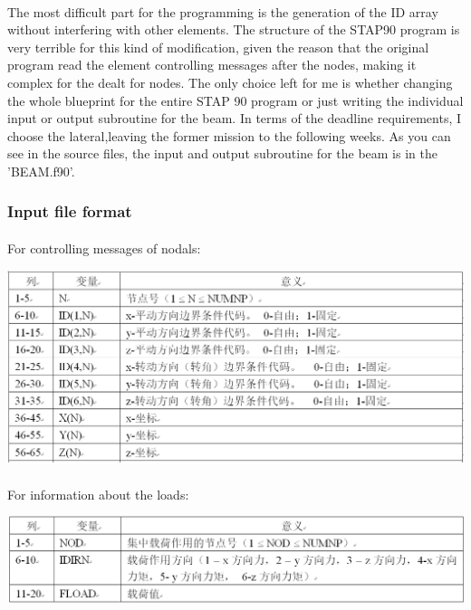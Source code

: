 \documentclass[UTF8]{ctexbook}
\begin{document}
\paragraph{}
The most difficult part for the programming is the generation of the ID array without interfering with other elements. The structure of the STAP90 program is very terrible for this kind of modification, given the reason that the original program read the element controlling messages after the nodes, making it complex for the dealt for nodes. The only choice left for me is whether changing the whole blueprint for the entire STAP 90 program or just writing the individual input or output subroutine for  the beam. In terms of the deadline requirements, I choose the lateral,leaving the former mission to the following weeks. As you can see in the source files, the input and output subroutine for the beam is in the 'BEAM.f90'.
\subsubsection{Input file format}
\paragraph{}For controlling messages of nodals:
\begin{center}
\includegraphics[width=1.0\textwidth]{beam3.png}
\end{center}
\paragraph{}For information about the loads:
\begin{center}
\includegraphics[width=1.0\textwidth]{beam4.png}
\end{center}
\end{document}
